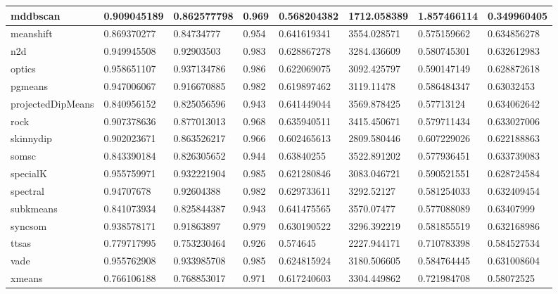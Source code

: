 \begin{table}[H]
\begin{tabular}{|l|l|l|l|l|l|l|l|}
\hline
mddbscan & 0.909045189 & 0.862577798 & 0.969 & 0.568204382 & 1712.058389 & 1.857466114 & 0.349960405 \\
\hline
meanshift & 0.869370277 & 0.84734777 & 0.954 & 0.641619341 & 3554.028571 & 0.575159662 & 0.634856278 \\
\hline
n2d & 0.949945508 & 0.92903503 & 0.983 & 0.628867278 & 3284.436609 & 0.580745301 & 0.632612983 \\
\hline
optics & 0.958651107 & 0.937134786 & 0.986 & 0.622069075 & 3092.425797 & 0.590147149 & 0.628872618 \\
\hline
pgmeans & 0.947006067 & 0.916670885 & 0.982 & 0.619897462 & 3119.11478 & 0.586484347 & 0.63032453 \\
\hline
projectedDipMeans & 0.840956152 & 0.825056596 & 0.943 & 0.641449044 & 3569.878425 & 0.57713124 & 0.634062642 \\
\hline
rock & 0.907378636 & 0.877013013 & 0.968 & 0.635940511 & 3415.450671 & 0.579711434 & 0.633027006 \\
\hline
skinnydip & 0.902023671 & 0.863526217 & 0.966 & 0.602465613 & 2809.580446 & 0.607229026 & 0.622188863 \\
\hline
somsc & 0.843390184 & 0.826305652 & 0.944 & 0.63840255 & 3522.891202 & 0.577936451 & 0.633739083 \\
\hline
specialK & 0.955759971 & 0.932221904 & 0.985 & 0.621280846 & 3083.046721 & 0.590521551 & 0.628724584 \\
\hline
spectral & 0.94707678 & 0.92604388 & 0.982 & 0.629733611 & 3292.52127 & 0.581254033 & 0.632409454 \\
\hline
subkmeans & 0.841073934 & 0.825844387 & 0.943 & 0.641475565 & 3570.07477 & 0.577088089 & 0.63407999 \\
\hline
syncsom & 0.938578171 & 0.91863897 & 0.979 & 0.630190522 & 3296.392219 & 0.581855519 & 0.632168986 \\
\hline
ttsas & 0.779717995 & 0.753230464 & 0.926 & 0.574645 & 2227.944171 & 0.710783398 & 0.584527534 \\
\hline
vade & 0.955762908 & 0.933985708 & 0.985 & 0.624815924 & 3180.506605 & 0.584764445 & 0.631008604 \\
\hline
xmeans & 0.766106188 & 0.768853017 & 0.971 & 0.617240603 & 3304.449862 & 0.721984708 & 0.58072525 \\
\hline
\end{tabular}
\end{table}

\clearpage

